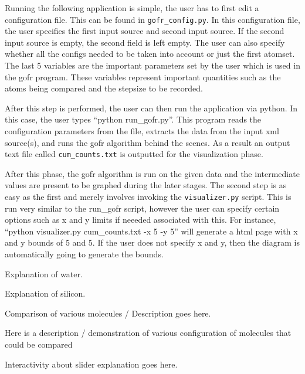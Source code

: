Running the following application is simple, the user has to first edit a configuration file. This can be found in \verb|gofr_config.py|. In this configuration file, the user specifies the first input source and second input source. If the second input source is empty, the second field is left empty. The user can also specify whether all the configs needed to be taken into account or just the first atomset. The last 5 variables are the important parameters set by the user which is used in the gofr program. These variables represent important quantities such as the atoms being compared and the stepsize to be recorded.




After this step is performed, the user can then run the application via python. In this case, the user types ``python run_gofr.py''. This program reads the configuration parameters from the file, extracts the data from the input xml source(s), and runs the gofr algorithm behind the scenes. As a result an output text file called \verb|cum_counts.txt| is outputted for the visualization phase.





After this phase, the gofr algorithm is run on the given data and the intermediate values are present to be graphed during the later stages. The second step is as easy as the first and merely involves invoking the \verb|visualizer.py| script. This is run very similar to the run_gofr script, however the user can specify certain options such as x and y limits if neeeded associated with this. For instance, ``python visualizer.py cum_counts.txt -x 5 -y 5'' will generate a html page with x and y bounds of 5 and 5. If the user does not specify x and y, then the diagram is automatically going to generate the bounds. 






Explanation of water.


Explanation of silicon.


Comparison of various molecules / Description goes here.



Here is a description / demonstration of various configuration of molecules that could be compared

Interactivity about slider explanation goes here. 